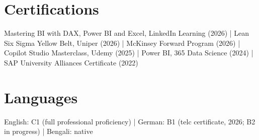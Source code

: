 \documentclass[10pt,a4paper]{article}
\begin{document}
\section{Certifications}
{\small
Mastering BI with DAX, Power BI and Excel, LinkedIn Learning (2026) | Lean Six Sigma Yellow Belt, Uniper (2026) | McKinsey Forward Program (2026) | Copilot Studio Masterclass, Udemy (2025) | Power BI, 365 Data Science (2024) | SAP University Alliances Certificate (2022)\par}

\section{Languages}
English: C1 (full professional proficiency) | German: B1 (telc certificate, 2026; B2 in progress) | Bengali: native
\end{document}
